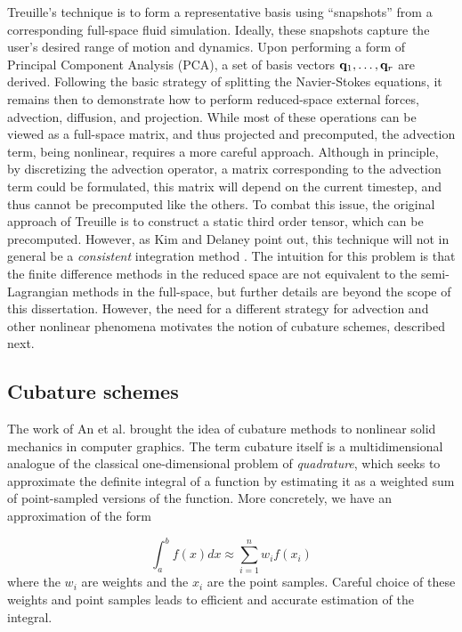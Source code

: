 {Treuille's technique is to form a representative basis using ``snapshots'' from a corresponding full-space fluid simulation. Ideally, these snapshots capture the 
user's desired range of motion and dynamics. Upon performing a form of Principal Component Analysis (PCA), a set of basis vectors $\mathbf{q}_1, \dots, \mathbf{q}_r$ are derived. Following the basic strategy of splitting the Navier-Stokes equations, it remains then to demonstrate how to perform reduced-space external forces,
advection, diffusion, and projection. While most of these operations can be viewed as a full-space matrix, and thus projected and precomputed, the advection
term, being nonlinear, requires a more careful approach. Although in principle, by discretizing the advection operator, a matrix corresponding
to the advection term could be formulated, this matrix will depend on the current timestep, and thus cannot be precomputed like the others. To combat this issue,
the original approach of Treuille is to construct a static third order tensor, which can be precomputed. However, as Kim and Delaney point out, this technique
will not in general be a {\em consistent} integration method \cite{Kim2013, Carlberg11}. The intuition for this problem is that the finite difference methods in the reduced space are not equivalent to the semi-Lagrangian methods in the full-space, but further details are beyond the scope of this dissertation. However, the need for a different strategy for advection and other nonlinear phenomena motivates the notion of cubature schemes, described next.

\subsection{Cubature schemes}
The work of An et al. \cite{An:2008} brought the idea of cubature methods to nonlinear solid mechanics in computer graphics. The term cubature itself is a multidimensional analogue
of the classical one-dimensional problem of {\em quadrature}, which seeks to approximate the definite integral of a function by estimating it as a weighted 
sum of point-sampled versions of the function. More concretely, we have an approximation of the form

\begin{equation}
\int_a^b f(x) dx \approx \sum_{i=1}^n w_i f(x_i)
\end{equation}
where the $w_i$ are weights and the $x_i$ are the point samples. Careful choice of these weights and point samples leads to efficient and accurate estimation of the integral.

}

